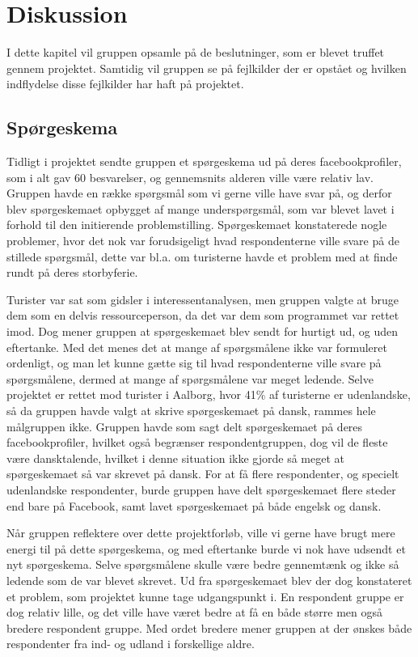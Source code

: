 \chapter{Diskussion}
I dette kapitel vil gruppen opsamle på de beslutninger, som er blevet truffet gennem projektet. Samtidig vil gruppen se på fejlkilder der er opstået og hvilken indflydelse disse fejlkilder har haft på projektet. 

\section{Spørgeskema}
Tidligt i projektet sendte gruppen et spørgeskema ud på deres facebookprofiler, som i alt gav 60 besvarelser, og gennemsnits alderen ville være relativ lav. Gruppen havde en række spørgsmål som vi gerne ville have svar på, og derfor blev spørgeskemaet opbygget af mange underspørgsmål, som var blevet lavet i forhold til den initierende problemstilling. Spørgeskemaet konstaterede nogle problemer, hvor det nok var forudsigeligt hvad respondenterne ville svare på de stillede spørgsmål, dette var bl.a. om turisterne havde et problem med at finde rundt på deres storbyferie.

Turister var sat som gidsler i interessentanalysen, men gruppen valgte at bruge dem som en delvis ressourceperson, da det var dem som programmet var rettet imod. Dog mener gruppen at spørgeskemaet blev sendt for hurtigt ud, og uden eftertanke. Med det menes det at mange af spørgsmålene ikke var formuleret ordenligt, og man let kunne gætte sig til hvad respondenterne ville svare på spørgsmålene, dermed at mange af spørgsmålene var meget ledende. Selve projektet er rettet mod turister i Aalborg, hvor 41\% af turisterne er udenlandske, så da gruppen havde valgt at skrive spørgeskemaet på dansk, rammes hele målgruppen ikke. Gruppen havde som sagt delt spørgeskemaet på deres facebookprofiler, hvilket også begrænser respondentgruppen, dog vil de fleste være dansktalende, hvilket i denne situation ikke gjorde så meget at spørgeskemaet så var skrevet på dansk. For at få flere respondenter, og specielt udenlandske respondenter, burde gruppen have delt spørgeskemaet flere steder end bare på Facebook, samt lavet spørgeskemaet på både engelsk og dansk. 

Når gruppen reflektere over dette projektforløb, ville vi gerne have brugt mere energi til på dette spørgeskema, og med eftertanke burde vi nok have udsendt et nyt spørgeskema. Selve spørgsmålene skulle være bedre gennemtænk og ikke så ledende som de var blevet skrevet. Ud fra spørgeskemaet blev der dog konstateret et problem, som projektet kunne tage udgangspunkt i. En respondent gruppe er dog relativ lille, og det ville have været bedre at få en både større men også bredere respondent gruppe. Med ordet bredere mener gruppen at der ønskes både respondenter fra ind- og udland i forskellige aldre.

